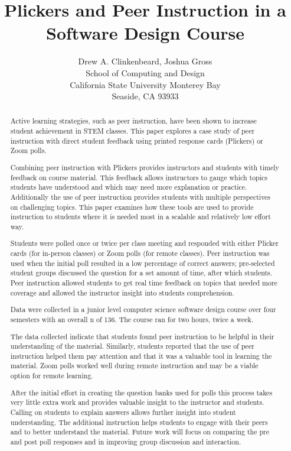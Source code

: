 \documentclass{article}
\title{Plickers and Peer Instruction in a Software Design Course}
\author{Drew A. Clinkenbeard, Joshua Gross\\
  School of Computing and Design\\
  California State University Monterey Bay\\
  Seaside, CA 93933\\
  \email{dclinkenbeard@csumb.edu}
  \email{jgross@csumb.edu}
}
\newcommand\sampleSize{136}
\begin{document}
\maketitle

\begin{abstract}
Active learning strategies, such as peer instruction, have been shown to increase student achievement in STEM classes.  This  paper explores a case study of peer instruction with direct student feedback using printed response cards (Plickers) or Zoom polls.

Combining peer instruction with Plickers provides instructors and students with timely feedback on course material.  This feedback allows instructors to gauge which topics students have understood and which may need more explanation or practice.  Additionally the use of peer instruction provides students with multiple perspectives on challenging topics.  This paper examines how these tools are used to provide instruction to students where it is needed most in a scalable and relatively low effort way.  

Students were polled once or twice per class meeting and responded with either Plicker cards (for in-person classes) or Zoom polls (for remote classes). Peer instruction was used  when the initial poll resulted in a low percentage of correct answers; pre-selected student groups  discussed the question for a set amount of time, after which students.  Peer instruction allowed students to get real time feedback on topics that needed more coverage and allowed the instructor insight into students comprehension.

Data were collected in a junior level computer science software design course over four semesters with an overall n of \sampleSize. The course ran for two hours, twice a week. 

The data collected indicate that students found peer instruction to be helpful in their understanding of the material.  Similarly, students reported that the use of peer instruction helped them pay attention and that it was a valuable tool in learning the material.  Zoom polls worked well during remote instruction and may be a viable option for remote learning.  

After the initial effort in creating the question banks used for polls this process takes very little extra work and provides valuable insight to the instructor and students.  Calling on students to explain answers allows further insight into student understanding.  The  additional instruction helps students to engage with their peers and to better understand the material.  Future work will focus on comparing the pre and post poll responses and in improving group discussion and interaction.

\end{abstract}
\end{document}

